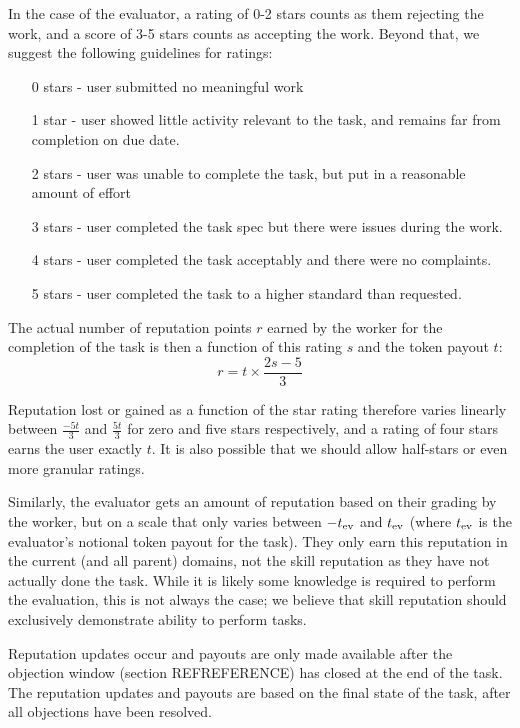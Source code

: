 In the case of the evaluator, a rating of 0-2 stars counts as them rejecting the work, and a score of 3-5 stars counts as accepting the work. Beyond that, we suggest the following guidelines for ratings:
\begin{itemize}
 \item[0 stars] - user submitted no meaningful work 
 \item[1 star\phantom{s}] - user showed little activity relevant to the task, and remains far from completion on due date.
 \item[2 stars] - user was unable to complete the task, but put in a reasonable amount of effort
 \item[3 stars] - user completed the task spec but there were issues during the work.
 \item[4 stars] - user completed the task acceptably and there were no complaints.
 \item[5 stars] - user completed the task to a higher standard than requested.
\end{itemize}

The actual number of reputation points $r$ earned by the worker for the completion of the task is then a function of this rating $s$ and the token payout $t$:
\begin{equation}\label{eq:stars-to-rep}
 r = t \times \frac{2s - 5}{3} 
\end{equation}
 
Reputation lost or gained as a function of the star rating therefore varies linearly between $\frac{-5t}{3}$ and $\frac{5t}{3}$ for zero and five stars respectively, and a rating of four stars earns the user exactly $t$. It is also possible that we should allow half-stars or even more granular ratings.

Similarly, the evaluator gets an amount of reputation based on their grading by the worker, but on a scale that only varies between $-t_{\rm ev}$ and $t_{\rm ev}$ (where $t_{\rm ev}$ is the evaluator's notional token payout for the task). They only earn this reputation in the current (and all parent) domains, not the skill reputation as they have not actually done the task. While it is likely some knowledge is required to perform the evaluation, this is not always the case; we believe that skill reputation should exclusively demonstrate ability to perform tasks.

Reputation updates occur and payouts are only made available after the objection window (section REFREFERENCE) has closed at the end of the task. The reputation updates and payouts are based on the final state of the task, after all objections have been resolved.

